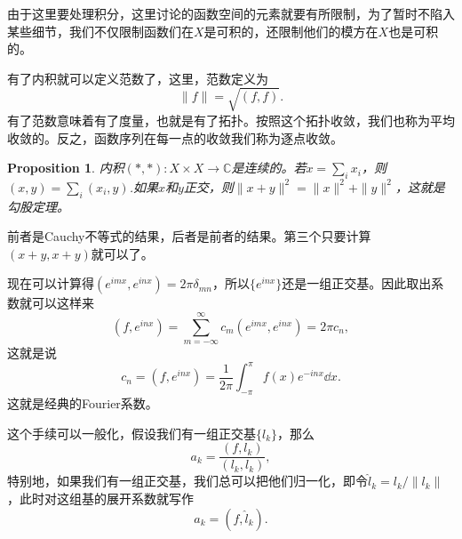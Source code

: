 \documentclass[10pt]{book}
\theoremstyle{plain}%
\newtheorem{pro}{Proposition}[chapter]%
\newcommand{\cc}{\mathbb{C}}
\begin{document}
由于这里要处理积分，这里讨论的函数空间的元素就要有所限制，为了暂时不陷入某些细节，我们不仅限制函数们在$X$是可积的，还限制他们的模方在$X$也是可积的。

有了内积就可以定义范数了，这里，范数定义为
\[
	\|f\|=\sqrt{(f,f)}.
\]
有了范数意味着有了度量，也就是有了拓扑。按照这个拓扑收敛，我们也称为平均收敛的。反之，函数序列在每一点的收敛我们称为逐点收敛。
\begin{pro}
内积$(*,*):X\times X\to \cc$是连续的。若$x=\sum_i x_i$，则$(x,y)=\sum_i (x_i,y)$.如果$x$和$y$正交，则$\|x+y\|^2=\|x\|^2+\|y\|^2$，这就是勾股定理。
\end{pro}
前者是Cauchy不等式的结果，后者是前者的结果。第三个只要计算$(x+y,x+y)$就可以了。

现在可以计算得$(e^{imx},e^{inx})=2\pi\delta_{mn}$，所以$\{e^{inx}\}$还是一组正交基。因此取出系数就可以这样来
\[
	(f,e^{inx})=\sum_{m=-\infty}^\infty c_m(e^{imx},e^{inx})=2\pi c_n,
\]
这就是说
\[
	c_n=(f,e^{inx})=\frac{1}{2\pi}\int_{-\pi}^\pi f(x)e^{-inx}\dd x.
\]
这就是经典的Fourier系数。

这个手续可以一般化，假设我们有一组正交基$\{l_k\}$，那么
\[
	a_k=\frac{(f,l_k)}{(l_k,l_k)},
\]
特别地，如果我们有一组正交基，我们总可以把他们归一化，即令$\hat{l}_k=l_k/\|l_k\|$，此时对这组基的展开系数就写作
\[
	a_k=(f,\hat{l}_k).
\]
\end{document}
